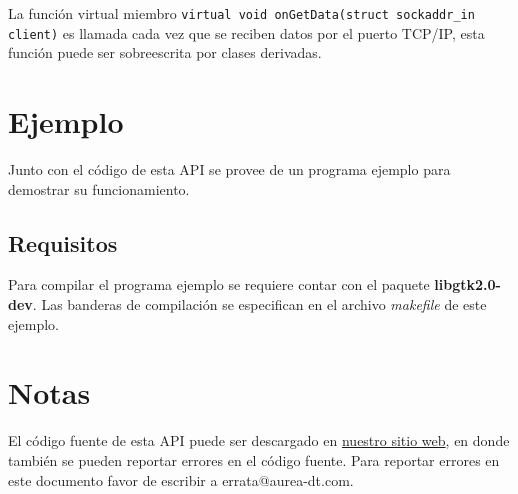 \documentclass[a4paper,10pt]{article}
\begin{document}
La función virtual miembro \texttt{virtual void onGetData(struct sockaddr\_in client)} es llamada cada vez que se reciben datos por el puerto TCP/IP, esta función puede ser sobreescrita por clases derivadas. 

\section{Ejemplo}
\label{ejemplo}
  Junto con el código de esta API se provee de un programa ejemplo para demostrar su funcionamiento.

  \subsection{Requisitos}
  Para compilar el programa ejemplo se requiere contar con el paquete \textbf{libgtk2.0-dev}. Las banderas de compilación se especifican en el archivo \textit{makefile} de este ejemplo.

\section{Notas}
\label{notas}
El código fuente de esta API puede ser descargado en \href{http://www.aurea-dt.com/#tcpip}{nuestro sitio web}, en donde también se pueden reportar errores en el código fuente. Para reportar errores en este documento favor de escribir a errata@aurea-dt.com.



%
\end{document}
